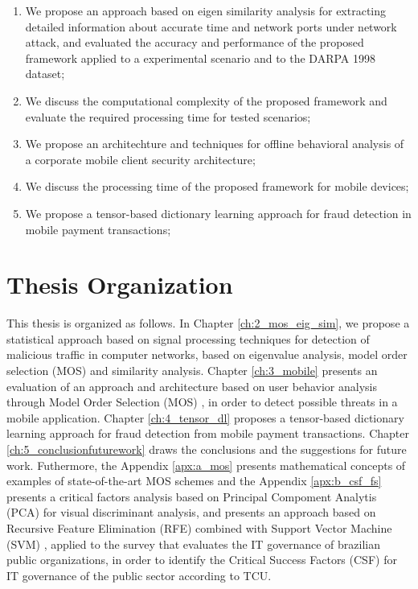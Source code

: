 \begin{enumerate}
	\item We propose an approach based on eigen similarity analysis for extracting detailed information about accurate time and network ports under network attack, and evaluated the accuracy and performance of the proposed framework applied to a experimental scenario and to the DARPA 1998 dataset;
	\item We discuss the computational complexity of the proposed framework and evaluate the required processing time for tested scenarios;
	\item We propose an architechture and techniques for offline behavioral analysis of a corporate mobile client security architecture;
	\item We discuss the processing time of the proposed framework for mobile devices;
	\item We propose a tensor-based dictionary learning approach for fraud detection in mobile payment transactions;
\end{enumerate}

\section{Thesis Organization}
\label{sc:organization}

This thesis is organized as follows. In Chapter \ref{ch:2_mos_eig_sim}, we propose a statistical approach based on signal processing techniques for detection of malicious traffic in computer networks, based on eigenvalue analysis, model order selection (MOS) and similarity analysis. Chapter \ref{ch:3_mobile} presents an evaluation of an approach and architecture based on user behavior analysis through Model Order Selection (MOS) \cite{tenorio2013greatest}, in order to detect possible threats in a mobile application. Chapter \ref{ch:4_tensor_dl} proposes a tensor-based dictionary learning approach for fraud detection from mobile payment transactions. Chapter \ref{ch:5_conclusionfuturework} draws the conclusions and the suggestions for future work. Futhermore, the Appendix \ref{apx:a_mos} presents mathematical concepts of examples of state-of-the-art MOS schemes and the Appendix \ref{apx:b_csf_fs} presents a critical factors analysis based on Principal Compoment Analytis (PCA) for visual discriminant analysis, and presents an approach based on Recursive Feature Elimination (RFE) combined with Support Vector Machine (SVM) \cite{hearst1998support}, applied to the survey that evaluates the IT governance of brazilian public organizations, in order to identify the Critical Success Factors (CSF) for IT governance of the public sector according to TCU.